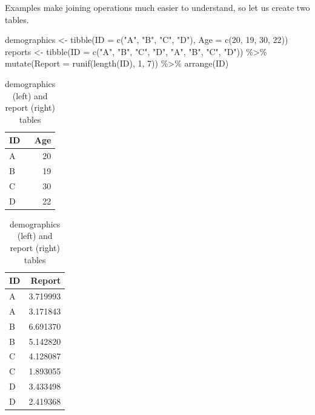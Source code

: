 \documentclass[
]{book}
\newenvironment{Shaded}{\begin{snugshade}}{\end{snugshade}}
\newcommand{\AttributeTok}[1]{\textcolor[rgb]{0.77,0.63,0.00}{#1}}
\newcommand{\DecValTok}[1]{\textcolor[rgb]{0.00,0.00,0.81}{#1}}
\newcommand{\FunctionTok}[1]{\textcolor[rgb]{0.00,0.00,0.00}{#1}}
\newcommand{\NormalTok}[1]{#1}
\newcommand{\OtherTok}[1]{\textcolor[rgb]{0.56,0.35,0.01}{#1}}
\newcommand{\SpecialCharTok}[1]{\textcolor[rgb]{0.00,0.00,0.00}{#1}}
\newcommand{\StringTok}[1]{\textcolor[rgb]{0.31,0.60,0.02}{#1}}
\begin{document}
Examples make joining operations much easier to understand, so let us create two tables.

\begin{Shaded}
\begin{Highlighting}[]
\NormalTok{demographics }\OtherTok{\textless{}{-}} \FunctionTok{tibble}\NormalTok{(}\AttributeTok{ID =} \FunctionTok{c}\NormalTok{(}\StringTok{"A"}\NormalTok{, }\StringTok{"B"}\NormalTok{, }\StringTok{"C"}\NormalTok{, }\StringTok{"D"}\NormalTok{),}
                       \AttributeTok{Age =} \FunctionTok{c}\NormalTok{(}\DecValTok{20}\NormalTok{, }\DecValTok{19}\NormalTok{, }\DecValTok{30}\NormalTok{, }\DecValTok{22}\NormalTok{))}
\NormalTok{reports }\OtherTok{\textless{}{-}} 
  \FunctionTok{tibble}\NormalTok{(}\AttributeTok{ID =} \FunctionTok{c}\NormalTok{(}\StringTok{"A"}\NormalTok{, }\StringTok{"B"}\NormalTok{, }\StringTok{"C"}\NormalTok{, }\StringTok{"D"}\NormalTok{, }\StringTok{"A"}\NormalTok{, }\StringTok{"B"}\NormalTok{, }\StringTok{"C"}\NormalTok{, }\StringTok{"D"}\NormalTok{)) }\SpecialCharTok{\%\textgreater{}\%}
  \FunctionTok{mutate}\NormalTok{(}\AttributeTok{Report =} \FunctionTok{runif}\NormalTok{(}\FunctionTok{length}\NormalTok{(ID), }\DecValTok{1}\NormalTok{, }\DecValTok{7}\NormalTok{)) }\SpecialCharTok{\%\textgreater{}\%}
  \FunctionTok{arrange}\NormalTok{(ID)}
\end{Highlighting}
\end{Shaded}

\begin{table}
\caption{\label{tab:unnamed-chunk-183}demographics (left) and report (right) tables}

\centering
\begin{tabular}[t]{l|r}
\hline
ID & Age\\
\hline
A & 20\\
\hline
B & 19\\
\hline
C & 30\\
\hline
D & 22\\
\hline
\end{tabular}
\centering
\begin{tabular}[t]{l|r}
\hline
ID & Report\\
\hline
A & 3.719993\\
\hline
A & 3.171843\\
\hline
B & 6.691370\\
\hline
B & 5.142820\\
\hline
C & 4.128087\\
\hline
C & 1.893055\\
\hline
D & 3.433498\\
\hline
D & 2.419368\\
\hline
\end{tabular}
\end{table}
\end{document}
